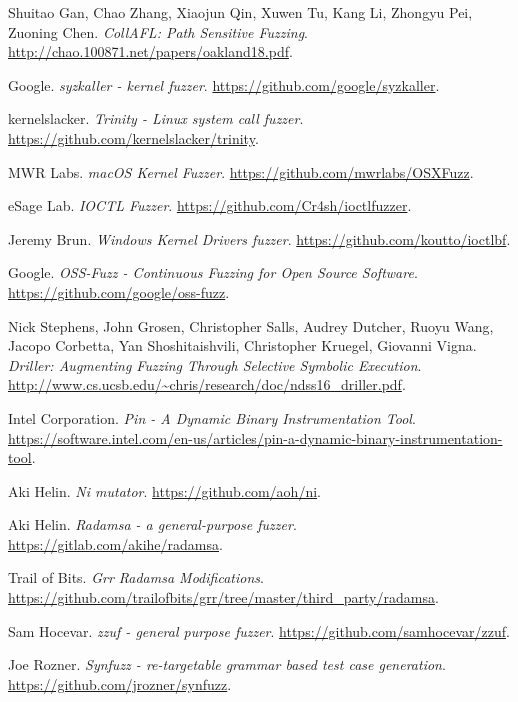 \begin{thebibliography}{99}
  Shuitao Gan, Chao Zhang, Xiaojun Qin, Xuwen Tu, Kang Li, Zhongyu Pei, Zuoning Chen.
  \textit{CollAFL: Path Sensitive Fuzzing}.
  \url{http://chao.100871.net/papers/oakland18.pdf}.

  Google.
  \textit{syzkaller - kernel fuzzer}.
  \url{https://github.com/google/syzkaller}.

  kernelslacker.
  \textit{Trinity - Linux system call fuzzer}.
  \url{https://github.com/kernelslacker/trinity}.

  MWR Labs.
  \textit{macOS Kernel Fuzzer}.
  \url{https://github.com/mwrlabs/OSXFuzz}.

  eSage Lab.
  \textit{IOCTL Fuzzer}.
  \url{https://github.com/Cr4sh/ioctlfuzzer}.

  Jeremy Brun.
  \textit{Windows Kernel Drivers fuzzer}.
  \url{https://github.com/koutto/ioctlbf}.

  Google.
  \textit{OSS-Fuzz - Continuous Fuzzing for Open Source Software}.
  \url{https://github.com/google/oss-fuzz}.

  Nick Stephens, John Grosen, Christopher Salls, Audrey Dutcher, Ruoyu Wang,
  Jacopo Corbetta, Yan Shoshitaishvili, Christopher Kruegel, Giovanni Vigna.
  \textit{Driller: Augmenting Fuzzing Through Selective Symbolic Execution}.
  \url{http://www.cs.ucsb.edu/~chris/research/doc/ndss16_driller.pdf}.

  Intel Corporation.
  \textit{Pin - A Dynamic Binary Instrumentation Tool}.
  \url{https://software.intel.com/en-us/articles/pin-a-dynamic-binary-instrumentation-tool}.

  Aki Helin.
  \textit{Ni mutator}.
  \url{https://github.com/aoh/ni}.

  Aki Helin.
  \textit{Radamsa - a general-purpose fuzzer}.
  \url{https://gitlab.com/akihe/radamsa}.

  Trail of Bits.
  \textit{Grr Radamsa Modifications}.
  \url{https://github.com/trailofbits/grr/tree/master/third_party/radamsa}.

  Sam Hocevar.
  \textit{zzuf - general purpose fuzzer}.
  \url{https://github.com/samhocevar/zzuf}.

  Joe Rozner.
  \textit{Synfuzz - re-targetable grammar based test case generation}.
  \url{https://github.com/jrozner/synfuzz}.


\end{thebibliography}
